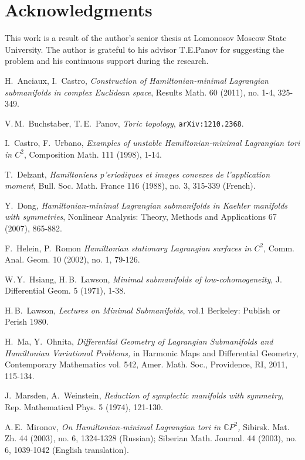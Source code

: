 \documentclass[jsg]{IP_v1_forauthors}
\theoremstyle{definition}
\numberwithin{equation}{section}
\begin{document}
\section*{Acknowledgments}

This work is a result of the author's senior thesis at Lomonosov Moscow State University. The author is  grateful to his advisor T.E.Panov for suggesting the problem and his continuous support during the research.

\begin{thebibliography}{16}

H.~Anciaux, I.~Castro, { \it Construction of Hamiltonian-minimal Lagrangian
submanifolds in complex Euclidean space}, Results Math. 60 (2011), no. 1-4, 325-349.

V.\,M.~Buchstaber, T.\,E.~Panov, { \it Toric topology}, {{\tt arXiv:1210.2368}}.

I.~Castro, F.~Urbano, { \it Examples of unstable Hamiltonian-minimal Lagrangian tori in $C^2$}, Composition Math. 111 (1998), 1-14.

T.~Delzant, {\it Hamiltoniens p'eriodiques et images convexes de l'application moment}, Bull. Soc. Math. France 116 (1988), no. 3, 315-339 (French).

Y.~Dong, {\it Hamiltonian-minimal Lagrangian submanifolds in Kaehler manifolds with symmetries}, Nonlinear Analysis: Theory, Methods and Applications 67 (2007), 865-882.

F.~Helein, P.~Romon {\it Hamiltonian stationary Lagrangian surfaces in $C^2$}, Comm. Anal. Geom. 10 (2002), no. 1, 79-126.

W.\,Y.~Hsiang, H.\,B.~Lawson, {\it Minimal submanifolds of low-cohomogeneity}, J. Differential Geom. 5 (1971), 1-38.

H.\,B.~Lawson, { \it Lectures on Minimal Submanifolds}, vol.1 Berkeley: Publish or Perish 1980.

H.~Ma, Y.~Ohnita, { \it Differential Geometry of Lagrangian Submanifolds and
Hamiltonian Variational Problems,} in Harmonic Maps and Differential Geometry, Contemporary Mathematics vol. 542, Amer. Math. Soc., Providence, RI, 2011, 115-134.

J.~Marsden, A.~Weinstein, {\it Reduction of symplectic manifolds with symmetry},
Rep. Mathematical Phys. 5 (1974), 121-130.

A.\,E.~Mironov, { \it On Hamiltonian-minimal Lagrangian tori in $\mathbb{C}P^2$,} Sibirsk. Mat. Zh. 44
(2003), no. 6, 1324-1328 (Russian); Siberian Math. Journal. 44 (2003), no. 6, 1039-1042 (English translation).


\end{thebibliography}
\end{document}
